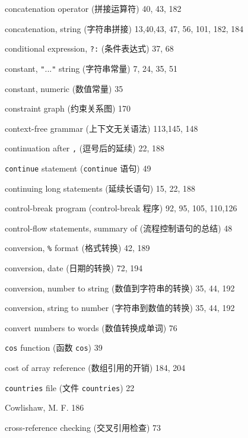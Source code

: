 \begin{multicols}{2}
\hangindent=2pc  concatenation operator (拼接运算符) 40, 43, 182

\hangindent=2pc  concatenation, string (字符串拼接) 13,40,43, 47, 56, 101, 182, 184

\hangindent=2pc  conditional expression, \verb'?:' (条件表达式) 37, 68

\hangindent=2pc  constant, \verb'"'...\verb'"' string
(字符串常量) 7, 24, 35, 51

\hangindent=2pc  constant, numeric (数值常量) 35

\hangindent=2pc  constraint graph (约束关系图) 170

\hangindent=2pc  context-free grammar (上下文无关语法) 113,145, 148

\hangindent=2pc  continuation after \verb',' (逗号后的延续) 22, 188

\hangindent=2pc  \verb'continue' statement (\verb'continue'
语句) 49

\hangindent=2pc  continuing long statements (延续长语句) 15, 22, 188

\hangindent=2pc  control-break program (control-break 程序) 92, 95, 105, 110,126

\hangindent=2pc  control-flow statements, summary of
(流程控制语句的总结) 48

\hangindent=2pc  conversion, \verb'%' format (格式转换) 42, 189

\hangindent=2pc  conversion, date (日期的转换) 72, 194

\hangindent=2pc  conversion, number to string
(数值到字符串的转换) 35, 44, 192

\hangindent=2pc  conversion, string to number
(字符串到数值的转换) 35, 44, 192

\hangindent=2pc  convert numbers to words (数值转换成单词) 76

\hangindent=2pc  \verb'cos' function (函数 \verb'cos') 39

\hangindent=2pc  cost of array reference (数组引用的开销) 184, 204

\hangindent=2pc  \verb'countries' file (文件 \verb'countries') 22

\hangindent=2pc  Cowlishaw, M. F. 186

\hangindent=2pc  cross-reference checking (交叉引用检查) 73


\end{multicols}
